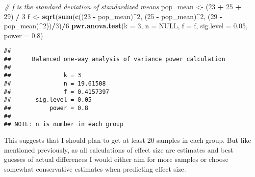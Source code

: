 \documentclass[
]{article}
\newenvironment{Shaded}{\begin{snugshade}}{\end{snugshade}}
\newcommand{\AttributeTok}[1]{\textcolor[rgb]{0.13,0.29,0.53}{#1}}
\newcommand{\CommentTok}[1]{\textcolor[rgb]{0.56,0.35,0.01}{\textit{#1}}}
\newcommand{\ConstantTok}[1]{\textcolor[rgb]{0.56,0.35,0.01}{#1}}
\newcommand{\DecValTok}[1]{\textcolor[rgb]{0.00,0.00,0.81}{#1}}
\newcommand{\FloatTok}[1]{\textcolor[rgb]{0.00,0.00,0.81}{#1}}
\newcommand{\FunctionTok}[1]{\textcolor[rgb]{0.13,0.29,0.53}{\textbf{#1}}}
\newcommand{\NormalTok}[1]{#1}
\newcommand{\OtherTok}[1]{\textcolor[rgb]{0.56,0.35,0.01}{#1}}
\newcommand{\SpecialCharTok}[1]{\textcolor[rgb]{0.81,0.36,0.00}{\textbf{#1}}}
\begin{document}
\begin{Shaded}
\begin{Highlighting}[]
\CommentTok{\# f is the standard deviation of standardized means}
\NormalTok{pop\_mean }\OtherTok{\textless{}{-}}\NormalTok{ (}\DecValTok{23} \SpecialCharTok{+} \DecValTok{25} \SpecialCharTok{+} \DecValTok{29}\NormalTok{) }\SpecialCharTok{/} \DecValTok{3}
\NormalTok{f }\OtherTok{\textless{}{-}} \FunctionTok{sqrt}\NormalTok{(}\FunctionTok{sum}\NormalTok{(}\FunctionTok{c}\NormalTok{((}\DecValTok{23} \SpecialCharTok{{-}}\NormalTok{ pop\_mean)}\SpecialCharTok{\^{}}\DecValTok{2}\NormalTok{, (}\DecValTok{25} \SpecialCharTok{{-}}\NormalTok{ pop\_mean)}\SpecialCharTok{\^{}}\DecValTok{2}\NormalTok{, (}\DecValTok{29} \SpecialCharTok{{-}}\NormalTok{ pop\_mean)}\SpecialCharTok{\^{}}\DecValTok{2}\NormalTok{))}\SpecialCharTok{/}\DecValTok{3}\NormalTok{)}\SpecialCharTok{/}\DecValTok{6}
\FunctionTok{pwr.anova.test}\NormalTok{(}\AttributeTok{k =} \DecValTok{3}\NormalTok{, }\AttributeTok{n =} \ConstantTok{NULL}\NormalTok{, }\AttributeTok{f =}\NormalTok{ f, }\AttributeTok{sig.level =} \FloatTok{0.05}\NormalTok{, }\AttributeTok{power =} \FloatTok{0.8}\NormalTok{)}
\end{Highlighting}
\end{Shaded}

\begin{verbatim}
## 
##      Balanced one-way analysis of variance power calculation 
## 
##               k = 3
##               n = 19.61508
##               f = 0.4157397
##       sig.level = 0.05
##           power = 0.8
## 
## NOTE: n is number in each group
\end{verbatim}

This suggests that I should plan to get at least 20 samples in each
group. But like mentioned previously, as all calculations of effect size
are estimates and best guesses of actual differences I would either aim
for more samples or choose somewhat conservative estimates when
predicting effect size.
\end{document}
